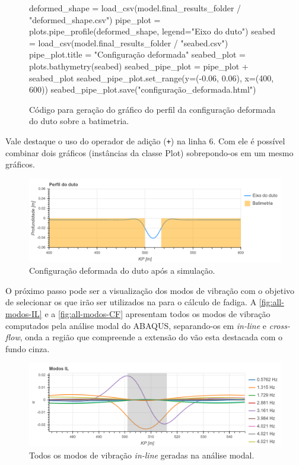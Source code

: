 \begin{figure}[!ht]
\caption{Código para geração do gráfico do perfil da configuração deformada do duto sobre a batimetria.}\label{code:deformada}
\begin{pythoncode}
deformed_shape = load_csv(model.final_results_folder / "deformed_shape.csv")
pipe_plot = plots.pipe_profile(deformed_shape, legend="Eixo do duto")
seabed = load_csv(model.final_results_folder / "seabed.csv")
pipe_plot.title = "Configuração deformada"
seabed_plot = plots.bathymetry(seabed)
seabed_pipe_plot = pipe_plot + seabed_plot
seabed_pipe_plot.set_range(y=(-0.06, 0.06), x=(400, 600))
seabed_pipe_plot.save("configuração_deformada.html")
\end{pythoncode}
\end{figure}

Vale destaque o uso do operador de adição (\texttt{+}) na linha 6. Com ele é possível combinar dois gráficos (instâncias da classe Plot) sobrepondo-os em um mesmo gráficos.

\begin{figure}[!ht]
	\centering
	\caption{Configuração deformada do duto após a simulação.}\label{fig:ex-config-deformada}
	\includegraphics[width=\textwidth]{imagens/exemplo/deformada}
\end{figure}

O próximo passo pode ser a visualização dos modos de vibração com o objetivo de selecionar os que irão ser utilizados na para o cálculo de fadiga. A \autoref{fig:all-modos-IL} e a \autoref{fig:all-modos-CF} apresentam todos os modos de vibração computados pela análise modal do ABAQUS, separando-os em \textit{in-line} e \textit{cross-flow}, onda a região que compreende a extensão do vão esta destacada com o fundo cinza.

\begin{figure}[H]
	\centering
	\caption{Todos os modos de vibração \textit{in-line} geradas na análise modal.}\label{fig:all-modos-IL}
	\includegraphics[width=\textwidth]{imagens/exemplo/all_modos_IL}
\end{figure}

